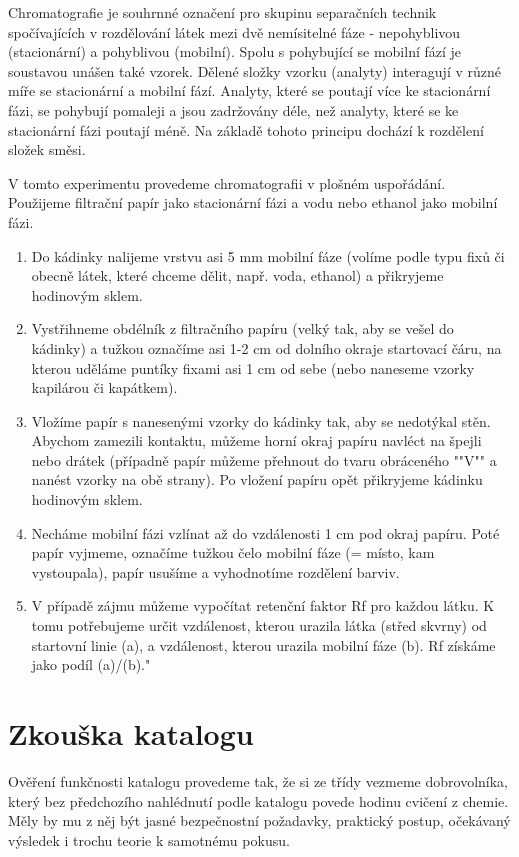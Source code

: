 

Chromatografie je souhrnné označení pro skupinu separačních technik spočívajících v rozdělování látek mezi dvě nemísitelné fáze - nepohyblivou (stacionární) a pohyblivou (mobilní). Spolu s pohybující se mobilní fází je soustavou unášen také vzorek. Dělené složky vzorku (analyty) interagují v různé míře se stacionární a mobilní fází. Analyty, které se poutají více ke stacionární fázi, se pohybují pomaleji a jsou zadržovány déle, než analyty, které se ke stacionární fázi poutají méně. Na základě tohoto principu dochází k rozdělení složek směsi.

V tomto experimentu provedeme chromatografii v plošném uspořádání. Použijeme filtrační papír jako stacionární fázi a vodu nebo ethanol jako mobilní fázi.


\begin{enumerate}
\item Do kádinky nalijeme vrstvu asi 5 mm mobilní fáze (volíme podle typu fixů či obecně látek, které chceme dělit, např. voda, ethanol) a přikryjeme hodinovým sklem.
\item Vystřihneme obdélník z filtračního papíru (velký tak, aby se vešel do kádinky) a tužkou označíme asi 1-2 cm od dolního okraje startovací čáru, na kterou uděláme puntíky fixami asi 1 cm od sebe (nebo naneseme vzorky kapilárou či kapátkem).
\item Vložíme papír s nanesenými vzorky do kádinky tak, aby se nedotýkal stěn. Abychom zamezili kontaktu, můžeme horní okraj papíru navléct na špejli nebo drátek (případně papír můžeme přehnout do tvaru obráceného ""V"" a nanést vzorky na obě strany). Po vložení papíru opět přikryjeme kádinku hodinovým sklem.
\item Necháme mobilní fázi vzlínat až do vzdálenosti 1 cm pod okraj papíru. Poté papír vyjmeme, označíme tužkou čelo mobilní fáze (= místo, kam vystoupala), papír usušíme a vyhodnotíme rozdělení barviv.
\item V případě zájmu můžeme vypočítat retenční faktor Rf pro každou látku. K tomu potřebujeme určit vzdálenost, kterou urazila látka (střed skvrny) od startovní linie (a), a vzdálenost, kterou urazila mobilní fáze (b). Rf získáme jako podíl (a)/(b)."
\end{enumerate}

\section{Zkouška katalogu}
Ověření funkčnosti katalogu provedeme tak, že si ze třídy vezmeme dobrovolníka, který bez předchozího nahlédnutí podle katalogu povede hodinu cvičení z chemie. Měly by mu z něj být jasné bezpečnostní požadavky, praktický postup, očekávaný výsledek i trochu teorie k samotnému pokusu.
